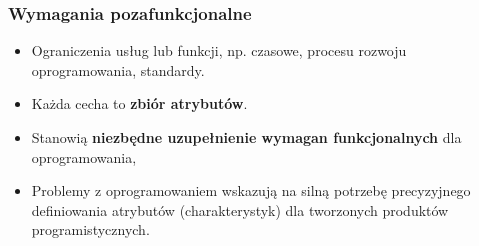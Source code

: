 \documentclass[../main.tex]{subfiles}
\begin{document}
    \subsubsection{Wymagania pozafunkcjonalne}
    \begin{itemize}
        \item Ograniczenia usług lub funkcji, np. czasowe, procesu rozwoju oprogramowania, standardy.
        \item Każda cecha to \textbf{zbiór atrybutów}.
        \item Stanowią \textbf{niezbędne uzupełnienie wymagan funkcjonalnych} dla oprogramowania,
        \item Problemy z oprogramowaniem wskazują na silną potrzebę precyzyjnego definiowania atrybutów
        (charakterystyk) dla tworzonych produktów programistycznych.
    \end{itemize}
\end{document}
